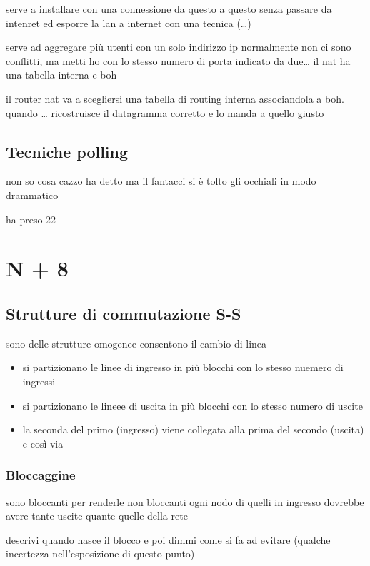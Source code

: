\documentclass[11pt]{article}
\begin{document}
serve a installare con una connessione da questo a questo senza passare da intenret
ed esporre la lan a internet con una tecnica (\ldots{})

serve ad aggregare più utenti con un solo indirizzo ip
normalmente non ci sono conflitti, ma metti ho con lo stesso numero di porta indicato da due\ldots{}
il nat ha una tabella interna e boh

il router nat va a scegliersi una tabella di routing interna associandola a boh.
quando \ldots{} ricostruisce il datagramma corretto e lo manda a quello giusto

\subsection{Tecniche polling}
\label{sec:org7bcb77f}
non so cosa cazzo ha detto ma il fantacci si è tolto gli occhiali in modo drammatico

ha preso 22

\section{N + 8}
\label{sec:org336a159}
\subsection{Strutture di commutazione S-S}
\label{sec:orgb14c6a4}
sono delle strutture omogenee
consentono il cambio di linea
\begin{itemize}
\item si partizionano le linee di ingresso in più blocchi con lo stesso nuemero di ingressi
\item si partizionano le lineee di uscita in più blocchi con lo stesso numero di uscite

\item la seconda del primo (ingresso) viene collegata alla prima del secondo (uscita) e così via
\end{itemize}

\subsubsection{Bloccaggine}
\label{sec:org3b614bc}
sono bloccanti
per renderle non bloccanti ogni nodo di quelli in ingresso dovrebbe avere tante uscite quante quelle della rete

descrivi quando nasce il blocco e poi dimmi come si fa ad evitare
(qualche incertezza nell'esposizione di questo punto)
\end{document}
